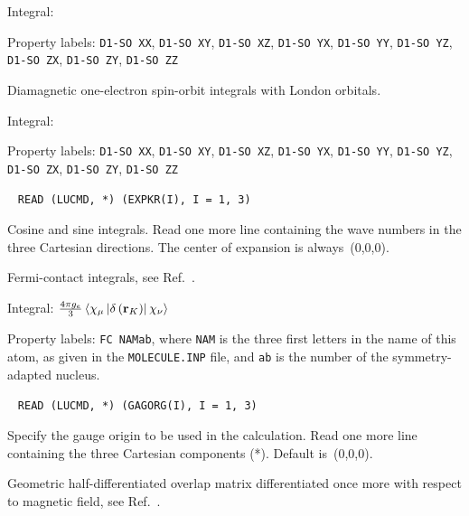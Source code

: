 \begin{description}
\begin{list}{}{}
\item Integral: 
\item Property labels: \verb|D1-SO XX|, \verb|D1-SO XY|, \verb|D1-SO XZ|, \verb|D1-SO YX|, \verb|D1-SO YY|, \verb|D1-SO YZ|, \verb|D1-SO ZX|, \verb|D1-SO ZY|, \verb|D1-SO ZZ|
\end{list}

\item[\Key{ELGDIL}] Diamagnetic one-electron spin-orbit integrals
with London orbitals.

\begin{list}{}{}
\item Integral: 
\item Property labels: \verb|D1-SO XX|, \verb|D1-SO XY|, \verb|D1-SO XZ|, \verb|D1-SO YX|, \verb|D1-SO YY|, \verb|D1-SO YZ|, \verb|D1-SO ZX|, \verb|D1-SO ZY|, \verb|D1-SO ZZ|
\end{list}

\item[\Key{EXPIKR}]\verb| |\newline
\verb|READ (LUCMD, *) (EXPKR(I), I = 1, 3)|

Cosine and sine integrals.
Read one more line containing the wave numbers in the three Cartesian
directions. The center of expansion is always~(0,0,0).

\item[\Key{FC}] Fermi-contact integrals, see
Ref.~\cite{ovhapjhjajsbpthjcp96}.

\begin{list}{}{}
\item Integral: $\frac{4\pi g_e}{3}\left<\chi_{\mu}\left|\delta\left({\bf
r}_K\right)\right|\chi_{\nu}\right>$
\item Property labels: \verb|FC NAMab|, where \verb|NAM| is the three
first letters in the name of this atom, as given in the
\verb|MOLECULE.INP| file, and \verb|ab| is the number of the
symmetry-adapted nucleus.
\end{list}

\item[\Key{GAUGEO}]\verb| |\newline
\verb|READ (LUCMD, *) (GAGORG(I), I = 1, 3)|

Specify the gauge origin to be used in the
calculation. Read one more line containing the three Cartesian
components (*). Default is~(0,0,0).

\item[\Key{HBDO}] Geometric half-differentiated overlap
matrix
differentiated once more with respect to magnetic field, see
Ref.~\cite{klbpjthkrhjajjcp98}. 


\end{description}
